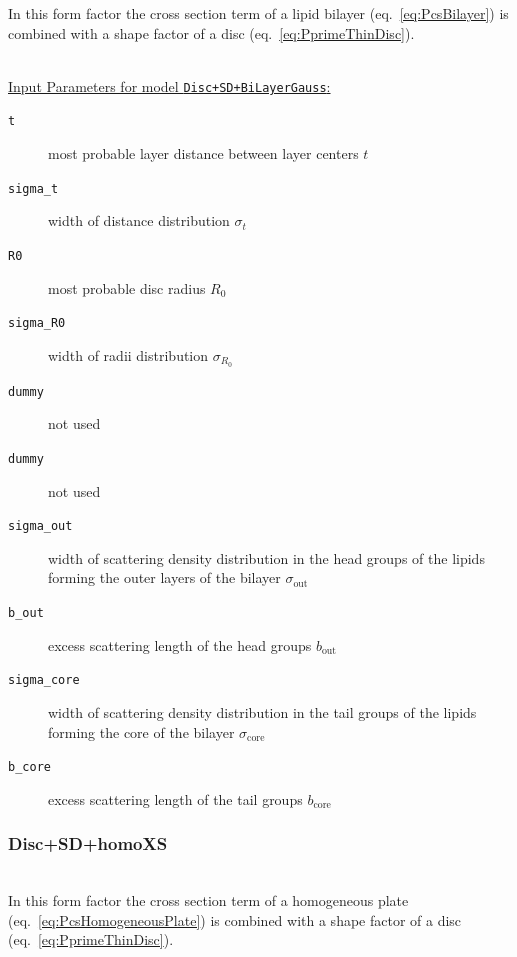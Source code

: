 \noindent
In this form factor the cross section term of a lipid bilayer (eq.\ \ref{eq:PcsBilayer}) is combined with a shape factor of a disc (eq.\ \ref{eq:PprimeThinDisc}).

\vspace{5mm}

\hspace{1pt}\\
\underline{Input Parameters for model \texttt{Disc+SD+BiLayerGauss}:}\\
\begin{description}
\item[\texttt{t}] most probable layer distance between layer centers $t$
\item[\texttt{sigma\_t}] width of distance distribution $\sigma_t$
\item[\texttt{R0}] most probable disc radius $R_0$
\item[\texttt{sigma\_R0}] width of radii distribution $\sigma_{R_0}$
\item[\texttt{dummy}] not used
\item[\texttt{dummy}] not used
\item[\texttt{sigma\_out}] width of scattering density distribution in the head groups of the lipids forming the outer layers of the bilayer $\sigma_\mathrm{out}$
\item[\texttt{b\_out}] excess scattering length of the head groups $b_\mathrm{out}$
\item[\texttt{sigma\_core}] width of scattering density distribution in the tail groups of the lipids forming the core of the bilayer $\sigma_\mathrm{core}$
\item[\texttt{b\_core}] excess scattering length of the tail groups $b_\mathrm{core}$
\end{description}

\vspace{5mm}

\noindent
\subsubsection{Disc+SD+homoXS} ~\\

\noindent
In this form factor the cross section term of a homogeneous plate (eq.\ \ref{eq:PcsHomogeneousPlate}) is combined with a shape factor of a disc (eq.\ \ref{eq:PprimeThinDisc}).

\vspace{5mm}


